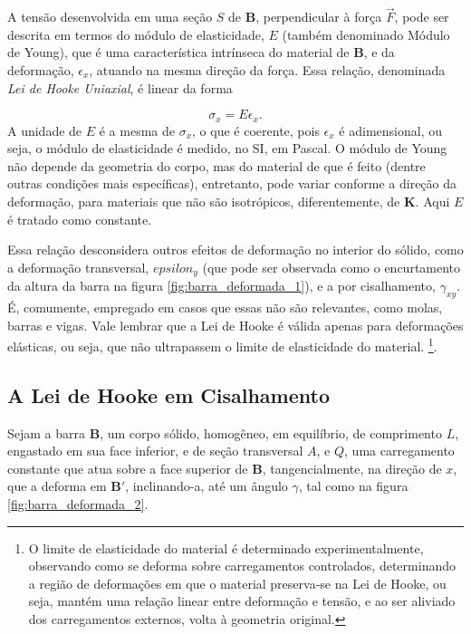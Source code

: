A tensão desenvolvida em uma seção $S$ de $\bm{B}$, perpendicular à força $\vec{F}$, pode ser descrita em termos do módulo de elasticidade, $E$ (também denominado Módulo de Young), que é uma característica intrínseca do material de $\bm{B}$, e da deformação, $\epsilon_x$, atuando na mesma direção da força. Essa relação, denominada \emph{Lei de Hooke Uniaxial}, é linear da forma

\begin{equation}
    \sigma_x = E \epsilon_x.
    \label{eq:lei_de_hooke_uniaxial}
\end{equation} 
A unidade de $E$ é a mesma de $\sigma_x$, o que é coerente, pois $\epsilon_x$ é adimensional, ou seja, o módulo de elasticidade é medido, no SI, em Pascal. O módulo de Young não depende da geometria do corpo, mas do material de que é feito (dentre outras condições mais específicas), entretanto, pode variar conforme a direção da deformação, para materiais que não são isotrópicos, diferentemente, de $\bm{K}$. Aqui $E$ é tratado como constante.

Essa relação desconsidera outros efeitos de deformação no interior do sólido, como a deformação transversal, $epsilon_y$ (que pode ser observada como o encurtamento da altura da barra na figura \ref{fig:barra_deformada_1}), e a por cisalhamento, $\gamma_{xy}$. É, comumente, empregado em casos que essas não são relevantes, como molas, barras e vigas. Vale lembrar que a Lei de Hooke é válida apenas para deformações elásticas, ou seja, que não ultrapassem o limite de elasticidade do material. \footnote{O limite de elasticidade do material é determinado experimentalmente, observando como se deforma sobre carregamentos controlados, determinando a região de deformações em que o material preserva-se na Lei de Hooke, ou seja, mantém uma relação linear entre deformação e tensão, e ao ser aliviado dos carregamentos externos, volta à geometria original.}.

\subsection{A Lei de Hooke em Cisalhamento}

Sejam a barra $\bm{B}$, um corpo sólido, homogêneo, em equilíbrio, de comprimento $L$, engastado em sua face inferior, e de seção transversal $A$, e $Q$, uma carregamento constante que atua sobre a face superior de $\bm{B}$, tangencialmente, na direção de $x$, que a deforma em $\bm{B}'$, inclinando-a, até um ângulo $\gamma$, tal como na figura \ref{fig:barra_deformada_2}. 

